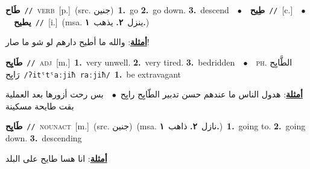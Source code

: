 \documentclass[10pt,a4paper,twoside]{article} %
\begin{document}
\begin{multicols}{2}
{\setlength\topsep{0pt}\textbf{\foreignlanguage{arabic}{طَاح}}\ {\color{gray}\texttt{//}\color{black}}\ \textsc{verb}\ [p.]\ (src. \color{gray}\foreignlanguage{arabic}{جنين}\color{black})\ \textbf{1.}~go  \textbf{2.}~go down.  \textbf{3.}~descend\ \ $\bullet$\ \ \setlength\topsep{0pt}\textbf{\foreignlanguage{arabic}{طِيح}}\ {\color{gray}\texttt{//}\color{black}}\ [c.]\ \ $\bullet$\ \ \setlength\topsep{0pt}\textbf{\foreignlanguage{arabic}{يطيح}}\ {\color{gray}\texttt{//}\color{black}}\ [i.]\ \color{gray}(msa. \foreignlanguage{arabic}{ينزل}~\foreignlanguage{arabic}{\textbf{٢.}}  \foreignlanguage{arabic}{يذهب}~\foreignlanguage{arabic}{\textbf{١.}})\color{black}\  \begin{flushright}\color{gray}\foreignlanguage{arabic}{\textbf{\underline{\foreignlanguage{arabic}{أمثلة}}}: والله ما أطيح دارهم لو شو ما صار!}\end{flushright}\color{black}} \vspace{2mm}

{\setlength\topsep{0pt}\textbf{\foreignlanguage{arabic}{طَايِح}}\ {\color{gray}\texttt{//}\color{black}}\ \textsc{adj}\ [m.]\ \textbf{1.}~very unwell.  \textbf{2.}~very tired.  \textbf{3.}~bedridden\ \ $\bullet$\ \ \textsc{ph.} \color{gray} \foreignlanguage{arabic}{الطَّايِح رَايِح}\color{black}\ {\color{gray}\texttt{/{\sffamily ʔitˤtˤaːjiħ raːjiħ}/}\color{black}}\ \textbf{1.}~be extravagant\  \begin{flushright}\color{gray}\foreignlanguage{arabic}{\textbf{\underline{\foreignlanguage{arabic}{أمثلة}}}: هدول الناس ما عندهم حسن تدبير الطّايِح رايِح\ $\bullet$\ \  بس رحت أزورها بعد العملية بقت طايحة مسكينة}\end{flushright}\color{black}} \vspace{2mm}

{\setlength\topsep{0pt}\textbf{\foreignlanguage{arabic}{طَايِح}}\ {\color{gray}\texttt{//}\color{black}}\ \textsc{noun\textunderscore act}\ [m.]\ (src. \color{gray}\foreignlanguage{arabic}{جنين}\color{black})\ \color{gray}(msa. \foreignlanguage{arabic}{نازل}~\foreignlanguage{arabic}{\textbf{٢.}}  \foreignlanguage{arabic}{ذاهب}~\foreignlanguage{arabic}{\textbf{١.}})\color{black}\ \textbf{1.}~going to.  \textbf{2.}~going down.  \textbf{3.}~descending\  \begin{flushright}\color{gray}\foreignlanguage{arabic}{\textbf{\underline{\foreignlanguage{arabic}{أمثلة}}}: انا هسا طايح على البلد}\end{flushright}\color{black}} \vspace{2mm}


\end{multicols}
\end{document}
